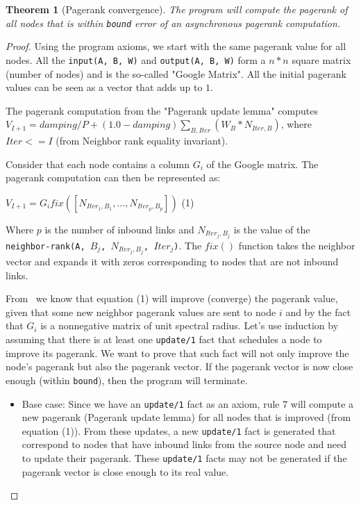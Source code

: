 \documentclass[9pt]{article}
\newtheorem{theorem}{Theorem}
\begin{document}
\begin{theorem}[Pagerank convergence]
The program will compute the pagerank of all nodes that is within \texttt{bound} error
of an asynchronous pagerank computation.
\end{theorem}
\begin{proof}
Using the program axioms, we start with the same pagerank value for all nodes.
All the \texttt{\bang input(A, B, W)} and \texttt{\bang output(A, B, W)} form
a $n * n$ square matrix (number of nodes) and is the so-called "Google Matrix".
All the initial pagerank values can be seen as a vector that adds up to $1$.

The pagerank computation from the "Pagerank update lemma" computes $V_{I + 1} =
damping / P + (1.0 - damping)\sum_{B, Iter} (W_{B} * N_{Iter,B})$, where
$Iter <= I$ (from Neighbor rank equality invariant).

Consider that each node contains a column $G_i$ of the Google matrix. The
pagerank computation can then be represented as:

$V_{I + 1} = G_i fix([N_{Iter_1, B_1}, ..., N_{Iter_p, B_p}])$ (1)

Where $p$ is the number of inbound links and $N_{Iter_j, B_j}$ is the value of
the \texttt{neighbor-rank(A, $B_j$, $N_{Iter_j, B_j}$, $Iter_j$)}. The $fix()$
function takes the neighbor vector and expands it with zeros corresponding to
nodes that are not inbound links.

From~\cite{DBLP:journals/corr/abs-cs-0606047, Lubachevsky:1986:CAA:4904.4801} we
know that equation (1) will improve (converge) the pagerank value, given that some new
neighbor pagerank values are sent to node $i$ and by the fact that $G_i$ is a
nonnegative matrix of unit spectral radius. Let's use induction by assuming that there
is at least one \texttt{update/1} fact that
schedules a node to improve its pagerank. We want to prove that such fact will
not only improve the node's pagerank but also the pagerank vector.
If the pagerank vector is now close enough (within \texttt{bound}), then the
program will terminate.

\begin{itemize}
   \item Base case: Since we have an \texttt{update/1} fact as an axiom, rule 7
   will compute a new pagerank (Pagerank update lemma) for all nodes that is
   improved (from equation (1)). From these updates, a new \texttt{update/1}
   fact is generated that correspond to nodes that have inbound links from the
   source node and need to update their pagerank. These \texttt{update/1} facts
   may not be generated if the pagerank vector is close enough to its real
   value.


\end{itemize}
\end{proof}
\end{document}

